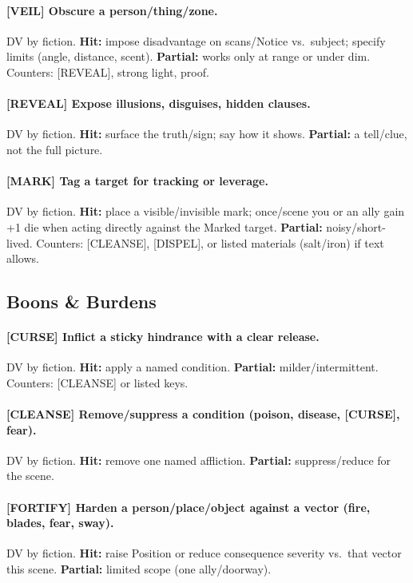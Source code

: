 \paragraph{[VEIL] Obscure a person/thing/zone.}
DV by fiction. \textbf{Hit:} impose disadvantage on scans/Notice vs.\ subject; specify limits (angle, distance, scent). \textbf{Partial:} works only at range or under dim. 
Counters: [REVEAL], strong light, proof.

\paragraph{[REVEAL] Expose illusions, disguises, hidden clauses.}
DV by fiction. \textbf{Hit:} surface the truth/sign; say how it shows. \textbf{Partial:} a tell/clue, not the full picture.

\paragraph{[MARK] Tag a target for tracking or leverage.}
DV by fiction. \textbf{Hit:} place a visible/invisible mark; once/scene you or an ally gain +1 die when acting directly against the Marked target. \textbf{Partial:} noisy/short-lived. 
Counters: [CLEANSE], [DISPEL], or listed materials (salt/iron) if text allows.

\subsection{Boons \& Burdens}
\paragraph{[CURSE] Inflict a sticky hindrance with a clear release.}
DV by fiction. \textbf{Hit:} apply a named condition. \textbf{Partial:} milder/intermittent. Counters: [CLEANSE] or listed keys.

\paragraph{[CLEANSE] Remove/suppress a condition (poison, disease, [CURSE], fear).}
DV by fiction. \textbf{Hit:} remove one named affliction. \textbf{Partial:} suppress/reduce for the scene.

\paragraph{[FORTIFY] Harden a person/place/object against a vector (fire, blades, fear, sway).}
DV by fiction. \textbf{Hit:} raise Position or reduce consequence severity vs.\ that vector this scene. \textbf{Partial:} limited scope (one ally/doorway).

